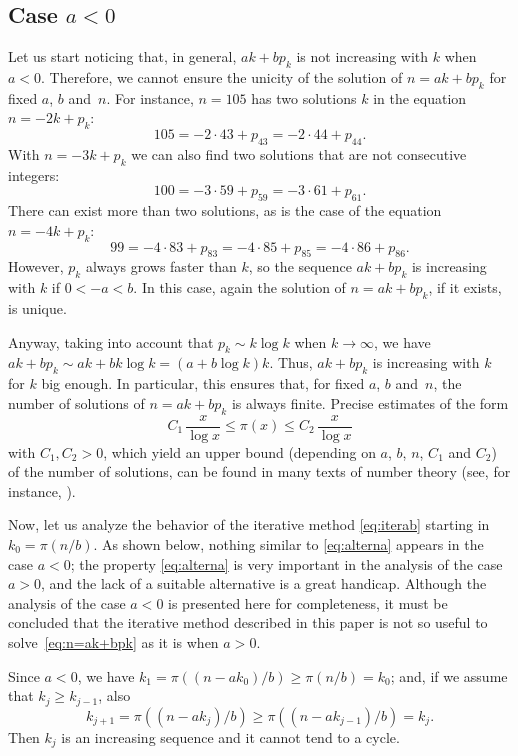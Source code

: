 \documentclass[12pt,reqno]{article}
\begin{document}
\subsection{Case $a<0$}
\label{sec:gena<0}

Let us start noticing that, in general, $ak + bp_k$ is not increasing with $k$ when $a<0$. 
Therefore, we cannot ensure the unicity of the solution of $n = ak + bp_k$ for fixed $a$, $b$ and~$n$.
For instance, $n=105$ has two solutions $k$ in the equation $n = -2k+p_k$:
\[
  105 = -2 \cdot 43 + p_{43} = -2 \cdot 44 + p_{44}.
\]
With $n = -3k+p_k$ we can also find two solutions that are not consecutive integers: 
\[
  100 = -3 \cdot 59 + p_{59} = -3 \cdot 61 + p_{61}.
\]
There can exist more than two solutions, as is the case of the equation $n = -4k+p_k$:
\[
  99 = -4 \cdot 83 + p_{83} = -4 \cdot 85 + p_{85} = -4 \cdot 86 + p_{86}.
\]
However, $p_k$ always grows faster than $k$, so the sequence $ak + bp_k$ is increasing with $k$ if $0 < -a < b$. 
In this case, again the solution of $n = ak + bp_k$, if it exists, is unique.

Anyway, taking into account that $p_k \sim k \log k$ when $k \to \infty$, we have
$ak + bp_k \sim ak + bk\log k = (a+b\log k)k$. 
Thus, $ak + bp_k$ is increasing with $k$ for $k$ big enough. 
In particular, this ensures that, for fixed $a$, $b$ and~$n$, the number of solutions of $n = ak + bp_k$ is always finite.
Precise estimates of the form
\[
  C_1 \, \frac{x}{\log x} \le \pi(x) \le C_2 \, \frac{x}{\log x}
\]
with $C_1, C_2 > 0$, which yield an upper bound (depending on $a$, $b$, $n$, $C_1$ and $C_2$) of the number of solutions, can be found in many texts of number theory (see, for instance, \cite[Theorem~8.8.1]{BaSh}).

Now, let us analyze the behavior of the iterative method \eqref{eq:iterab} starting in $k_0 = \pi(n/b)$.
As shown below, nothing similar to \eqref{eq:alterna} appears in the case $a<0$;
the property \eqref{eq:alterna} is very important in the analysis of the case $a>0$,
and the lack of a suitable alternative is a great handicap.
Although the analysis of the case $a<0$ is presented here for completeness, it must be concluded that
the iterative method described in this paper is not so useful to solve~\eqref{eq:n=ak+bpk}
as it is when $a>0$.

Since $a<0$, we have $k_1 = \pi((n-a k_0)/b) \ge \pi(n/b) = k_0$; 
and, if we assume that $k_j \ge k_{j-1}$, also
\[
  k_{j+1} = \pi((n-a k_j)/b) \ge \pi((n-a k_{j-1})/b) = k_j.
\]
Then $k_j$ is an increasing sequence and it cannot tend to a cycle.
\end{document}
